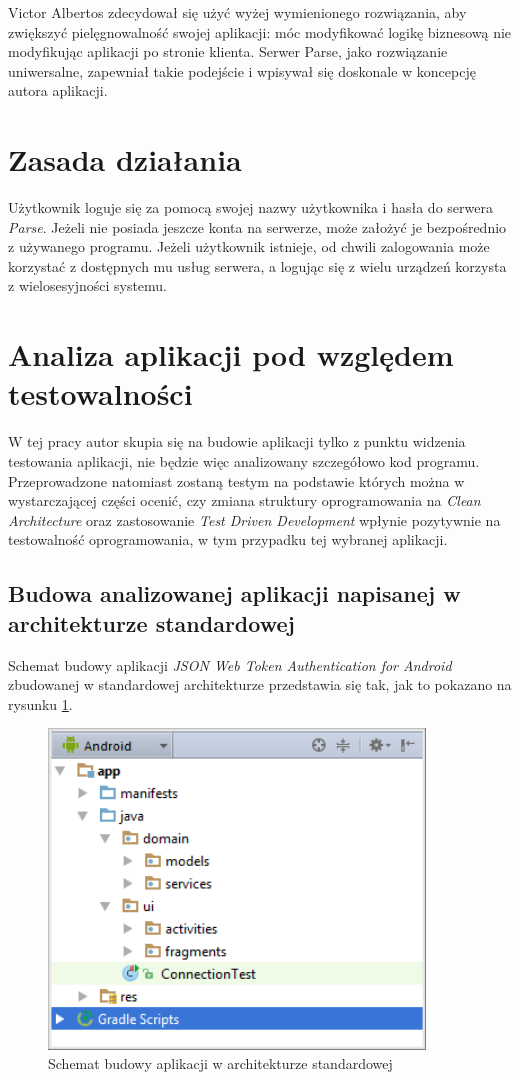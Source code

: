 Victor Albertos zdecydował się użyć wyżej wymienionego rozwiązania, aby zwiększyć pielęgnowalność swojej aplikacji: móc modyfikować logikę biznesową nie modyfikując aplikacji po stronie klienta. Serwer Parse, jako rozwiązanie uniwersalne, zapewniał takie podejście i wpisywał się doskonale w koncepcję autora aplikacji.

\section{Zasada działania}
Użytkownik loguje się za pomocą swojej nazwy użytkownika i hasła do serwera \textit{Parse}. Jeżeli nie posiada jeszcze konta na serwerze, może założyć je bezpośrednio z używanego programu. Jeżeli użytkownik istnieje, od chwili zalogowania może korzystać z dostępnych mu usług serwera, a logując się z wielu urządzeń korzysta z wielosesyjności systemu. 

\section{Analiza aplikacji pod względem testowalności}
W tej pracy autor skupia się na budowie aplikacji tylko z punktu widzenia testowania aplikacji, nie będzie więc analizowany szczegółowo kod programu. Przeprowadzone natomiast zostaną testym na podstawie których można w wystarczającej części ocenić, czy zmiana struktury oprogramowania na \textit{Clean Architecture} oraz zastosowanie  \textit{Test Driven Development} wpłynie pozytywnie na testowalność oprogramowania, w tym przypadku tej wybranej aplikacji.

\newpage
\subsection{Budowa analizowanej aplikacji napisanej w architekturze standardowej}
Schemat budowy aplikacji \textit{JSON Web Token Authentication for Android} zbudowanej w standardowej architekturze przedstawia się tak, jak to pokazano na rysunku \ref{fig:app_std}.

\begin{figure}[!htb]
    \centering
    \includegraphics[width=10cm]{imgs/ch6_app_st.png}
    \caption
{Schemat budowy aplikacji w architekturze standardowej}
    \label{fig:app_std}
\end{figure} 


